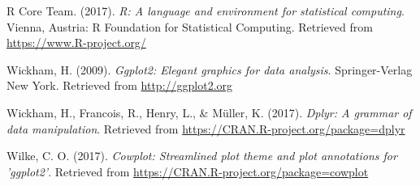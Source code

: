 \documentclass[english,floatsintext,man]{apa6}
\theoremstyle{definition}
\theoremstyle{definition}
\theoremstyle{definition}
\theoremstyle{remark}
\begin{document}
\hypertarget{ref-R-base}{}
R Core Team. (2017). \emph{R: A language and environment for statistical
computing}. Vienna, Austria: R Foundation for Statistical Computing.
Retrieved from \url{https://www.R-project.org/}

\hypertarget{ref-R-ggplot2}{}
Wickham, H. (2009). \emph{Ggplot2: Elegant graphics for data analysis}.
Springer-Verlag New York. Retrieved from \url{http://ggplot2.org}

\hypertarget{ref-R-dplyr}{}
Wickham, H., Francois, R., Henry, L., \& Müller, K. (2017). \emph{Dplyr:
A grammar of data manipulation}. Retrieved from
\url{https://CRAN.R-project.org/package=dplyr}

\hypertarget{ref-R-cowplot}{}
Wilke, C. O. (2017). \emph{Cowplot: Streamlined plot theme and plot
annotations for 'ggplot2'}. Retrieved from
\url{https://CRAN.R-project.org/package=cowplot}
\end{document}
